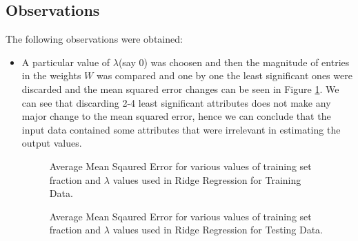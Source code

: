 \documentclass{article}
\begin{document}
\subsection*{Observations}
The following observations were obtained:
\begin{itemize}

\begin{figure}[H]
 \caption{Mean Sqaured Error for after discarding increasing number of least significant weights in $W$.}
 \label{fig:1}
 \end{figure}
 
\item A particular value of $\lambda$(say $0$) was choosen and then the magnitude of entries in the weights $W$ was compared and one by one the least significant ones were discarded and the mean squared error changes can be seen in Figure \ref{fig:1}. We can see that discarding 2-4 least significant attributes does not make any major change to the mean squared error, hence we can conclude that the input data contained some attributes that were irrelevant in estimating the output values.

\begin{figure}[H]
 \caption{Average Mean Sqaured Error for various values of training set fraction and $\lambda$ values used in Ridge Regression for Training Data.}
 \label{fig:2}
 \end{figure}

 \begin{figure}[H]
 \caption{Average Mean Sqaured Error for various values of training set fraction and $\lambda$ values used in Ridge Regression for Testing Data.}
 \label{fig:3}
 \end{figure}


\end{itemize}
\end{document}
